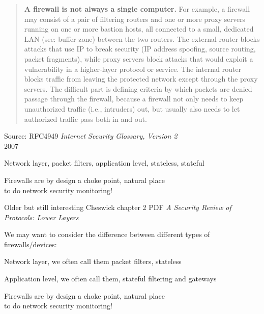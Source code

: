 \documentclass[Screen16to9,17pt]{foils}
\begin{document}
\begin{quote}\small
{\bf A firewall is not always a single computer.} For example, a firewall may consist of a pair of filtering routers and one or more proxy servers running on one or more bastion hosts, all connected to a small, dedicated LAN (see: buffer zone) between the two routers. The external router blocks attacks that use IP to break security (IP address spoofing, source routing, packet fragments), while proxy servers block attacks that would exploit a vulnerability in a higher-layer protocol or service. The internal router blocks traffic from leaving the protected network except through the proxy servers. The difficult part is defining criteria by which packets are denied passage through the firewall, because a firewall not only needs to keep unauthorized traffic (i.e., intruders) out, but usually also needs to let authorized traffic pass both in and out.
\end{quote}
{\footnotesize Source: RFC4949 \emph{Internet Security Glossary, Version 2}\\
 2007}

\begin{list2}
\item Network layer, packet filters, application level, stateless, stateful
\item Firewalls are by design a choke point, natural place \\
to do network security monitoring!
\item Older but still interesting Cheswick chapter 2 PDF
\emph{A Security Review of Protocols:
Lower Layers}\\
\end{list2}



We may want to consider the difference between different types of firewalls/devices:
\begin{list2}
\item Network layer, we often call them packet filters, stateless
\item Application level, we often call them, stateful filtering and gateways
\item Firewalls are by design a choke point, natural place \\
to do network security monitoring!
\end{list2}
\end{document}
